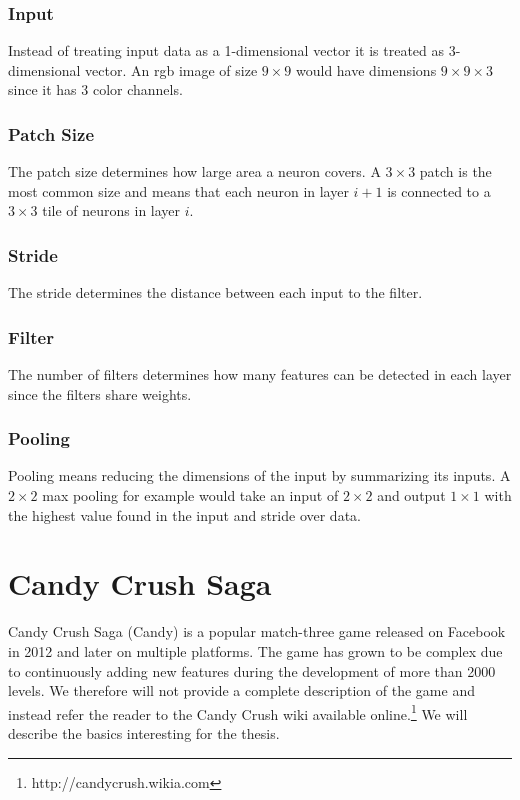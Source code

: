 \documentclass{kththesis}
\begin{document}
\subsubsection{Input}
Instead of treating input data as a 1-dimensional vector it is treated as  3-dimensional vector. An  rgb image of size $9\times9$ would have dimensions  $9\times9\times3$ since it has 3 color channels. 

\subsubsection{Patch Size}
The patch size determines how large area a neuron covers. A $3\times3$ patch is the most common size and means that each neuron in layer $i+1$ is connected to a  $3\times3$ tile of neurons in layer $i$.

\subsubsection{Stride}
The stride determines the distance between each input to the filter.

\subsubsection{Filter}
The number of filters determines how many features can be detected in each layer since the filters share weights.

\subsubsection{Pooling}
Pooling means reducing the dimensions of the input by summarizing its inputs. A $2\times2$ max pooling for example would take an input of $2\times2$ and output $1\times1$ with the highest value found in the input and stride over data.

\section{Candy Crush Saga}
Candy Crush Saga (Candy) is a popular match-three game released on Facebook in 2012  and  later on multiple platforms. The game has grown to be complex due to continuously adding new features during the development of more than 2000 levels.  We therefore will not provide a complete description of the game and instead refer the reader to the Candy Crush wiki available online.\footnote{http://candycrush.wikia.com} We will describe the basics interesting for the thesis.
\end{document}
